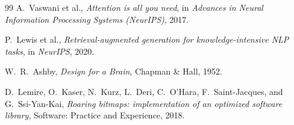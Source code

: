 \documentclass[11pt,a4paper]{article}
\theoremstyle{remark}
\begin{document}
\begin{thebibliography}{99}
 A.~Vaswani et al., \textit{Attention is all you need}, in
\textit{Advances in Neural Information Processing Systems (NeurIPS)}, 2017.

 P.~Lewis et al., \textit{Retrieval-augmented generation for
knowledge-intensive NLP tasks}, in \textit{NeurIPS}, 2020.

 W.~R.~Ashby, \textit{Design for a Brain}, Chapman \& Hall,
1952.

 D.~Lemire, O.~Kaser, N.~Kurz, L.~Deri, C.~O'Hara,
F.~Saint-Jacques, and G.~Ssi-Yan-Kai, \textit{Roaring bitmaps: implementation of
an optimized software library}, Software: Practice and Experience, 2018.
\end{thebibliography}
\end{document}
